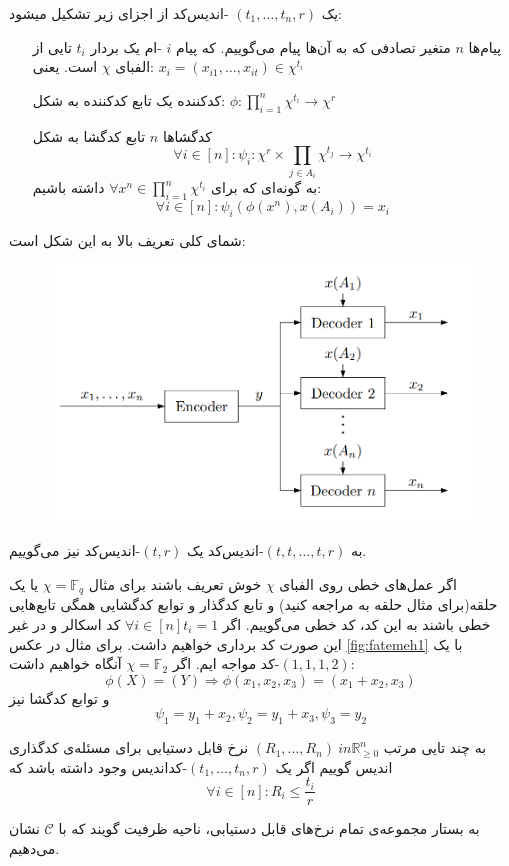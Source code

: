 \begin{definition}
	\label{def:icod}
	یک
	$(t_1, \ldots, t_n, r)$
	-اندیس‌کد از اجزای زیر تشکیل میشود:
	\begin{itemize}
		\item [پیام‌ها]
		$n$
		 متغیر تصادفی که به آن‌ها پیام می‌گوییم. که پیام
		  $i$
		  -ام یک بردار 
		  $t_i$
		  تایی از الفبای
		  $\chi$
		  است. یعنی:
		  $x_i = (x_{i1}, \ldots, x_{it}) \in \chi^{t_i}$
		  \item[
		  کدکننده
		  ]
		   یک تابع کدکننده به شکل:
		   $\phi: \prod\limits_{i = 1}^n \chi^{t_i}  \rightarrow \chi^r$
		  \item[
		  کدگشاها
		  ]
		  $n$
		  تابع کدگشا به شکل
		  $$\forall i \in [n]: \psi_i: \chi^r \times  \prod\limits_{j \in A_i} \chi^{t_j} \rightarrow \chi^{t_i}$$
		  به گونه‌ای که برای
		  $\forall x^n \in \prod\limits_{i = 1}^{n} \chi^{t_i}$
		  داشته باشیم:
		  $$\forall i \in [n]: \psi_i(\phi(x^n), x(A_i)) = x_i$$
	\end{itemize}
\end{definition}
شمای کلی تعریف بالا به این شکل است:
\begin{figure}[H]
	\centering
	\includegraphics[width=0.7\linewidth]{figs/chapter1/fatemeh2}
	\caption{}
	\label{fig:fatemeh2}
\end{figure}

	به 
	$(t, t, \ldots, t, r)$-اندیس‌کد
	یک
	$(t, r)$-اندیس‌کد
	نیز می‌گوییم.
	
	اگر عمل‌های خطی روی الفبای
	$\chi$
	خوش تعریف باشند برای مثال
	$\chi = \mathbb{F}_q$
	یا یک حلقه(برای مثال حلقه به 
	\cite{Connelly2018}
	مراجعه کنید) و تابع کدگذار و توابع کدگشایی همگی تابع‌هایی خطی باشند به این کد، کد خطی می‌گوییم. اگر 
	$\forall i \in [n] t_i = 1$
	کد اسکالر و در غیر این صورت کد برداری خواهیم داشت. برای مثال در عکس 
	\ref{fig:fatemeh1}
	با یک 
	$(1, 1, 1, 2)$-کد
	مواجه ایم. اگر
	$\chi = \mathbb{F}_2$
	آنگاه خواهیم داشت:
	$$\phi(X) = (Y) \Rightarrow \phi(x_1, x_2, x_3) = (x_1 + x_2, x_3)$$
	و توابع کدگشا نیز
	$$\psi_1 = y_1 + x_2, \psi_2 = y_1 + x_3, \psi_3 = y_2$$
	\begin{definition}
		به چند تایی مرتب
		$(R_1, \ldots, R_n) \ in \mathbb{R}_{\geqslant 0}^n$
		نرخ قابل دستیابی برای مسئله‌ی کدگذاری اندیس گوییم اگر یک 
		$(t_1, \ldots, t_n, r)$-کداندیس
		وجود داشته باشد که
		$$\forall i \in [n]: R_i \leq \frac{t_i}{r}$$
		
		به بستار مجموعه‌ی تمام نرخ‌های قابل دستیابی، ناحیه ظرفیت گویند که با
		$\mathscr{C}$
		نشان می‌دهیم.
	\end{definition}
	
